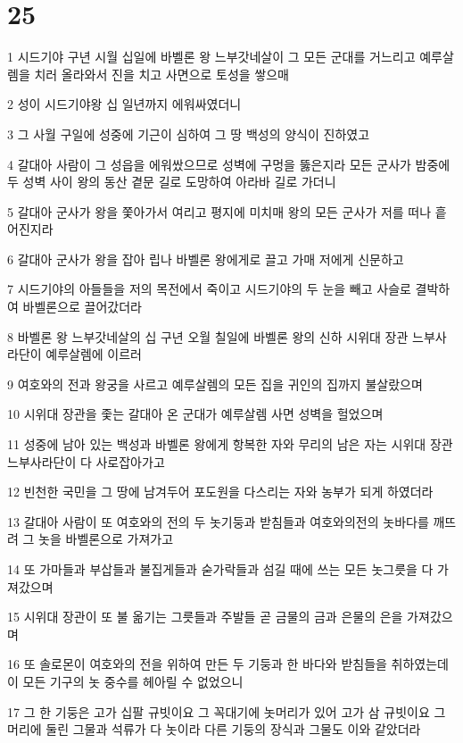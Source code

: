 \chapter{25}

\par 1 시드기야 구년 시월 십일에 바벨론 왕 느부갓네살이 그 모든 군대를 거느리고 예루살렘을 치러 올라와서 진을 치고 사면으로 토성을 쌓으매
\par 2 성이 시드기야왕 십 일년까지 에워싸였더니
\par 3 그 사월 구일에 성중에 기근이 심하여 그 땅 백성의 양식이 진하였고
\par 4 갈대아 사람이 그 성읍을 에워쌌으므로 성벽에 구멍을 뚫은지라 모든 군사가 밤중에 두 성벽 사이 왕의 동산 곁문 길로 도망하여 아라바 길로 가더니
\par 5 갈대아 군사가 왕을 쫓아가서 여리고 평지에 미치매 왕의 모든 군사가 저를 떠나 흩어진지라
\par 6 갈대아 군사가 왕을 잡아 립나 바벨론 왕에게로 끌고 가매 저에게 신문하고
\par 7 시드기야의 아들들을 저의 목전에서 죽이고 시드기야의 두 눈을 빼고 사슬로 결박하여 바벨론으로 끌어갔더라
\par 8 바벨론 왕 느부갓네살의 십 구년 오월 칠일에 바벨론 왕의 신하 시위대 장관 느부사라단이 예루살렘에 이르러
\par 9 여호와의 전과 왕궁을 사르고 예루살렘의 모든 집을 귀인의 집까지 불살랐으며
\par 10 시위대 장관을 좇는 갈대아 온 군대가 예루살렘 사면 성벽을 헐었으며
\par 11 성중에 남아 있는 백성과 바벨론 왕에게 항복한 자와 무리의 남은 자는 시위대 장관 느부사라단이 다 사로잡아가고
\par 12 빈천한 국민을 그 땅에 남겨두어 포도원을 다스리는 자와 농부가 되게 하였더라
\par 13 갈대아 사람이 또 여호와의 전의 두 놋기둥과 받침들과 여호와의전의 놋바다를 깨뜨려 그 놋을 바벨론으로 가져가고
\par 14 또 가마들과 부삽들과 불집게들과 숟가락들과 섬길 때에 쓰는 모든 놋그릇을 다 가져갔으며
\par 15 시위대 장관이 또 불 옮기는 그릇들과 주발들 곧 금물의 금과 은물의 은을 가져갔으며
\par 16 또 솔로몬이 여호와의 전을 위하여 만든 두 기둥과 한 바다와 받침들을 취하였는데 이 모든 기구의 놋 중수를 헤아릴 수 없었으니
\par 17 그 한 기둥은 고가 십팔 규빗이요 그 꼭대기에 놋머리가 있어 고가 삼 규빗이요 그 머리에 둘린 그물과 석류가 다 놋이라 다른 기둥의 장식과 그물도 이와 같았더라
